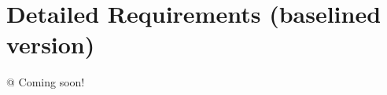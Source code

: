 \documentclass{article}
\begin{document}
\section*{Detailed Requirements (baselined version)}

\begin{easylist}[articletoc]
@ Coming soon!

\end{easylist}
\end{document}
